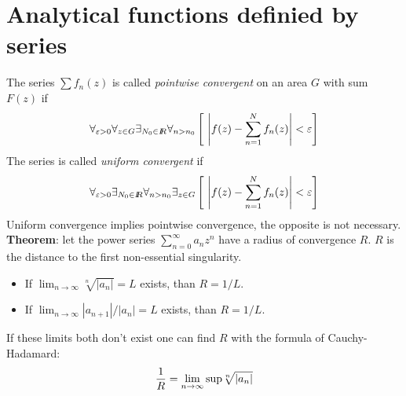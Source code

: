 \documentclass[a4paper,fancyheadings,twoside]{report}
\begin{document}
\section{Analytical functions definied by series}
The series $\sum f_n(z)$ is called {\it pointwise convergent} on an area $G$
with sum $F(z)$ if
\[
\forall_{\varepsilon>0}\forall_{z\in G}\exists_{N_0\in I\hspace{-1mm}R}\forall_{n>n_0}
\left[~\left|f(z)-\sum_{n=1}^Nf_n(z)\right|<\varepsilon\right]
\]
The series is called {\it uniform convergent} if
\[
\forall_{\varepsilon>0}\exists_{N_0\in I\hspace{-1mm}R}\forall_{n>n_0}\exists_{z\in G}
\left[~\left|f(z)-\sum_{n=1}^Nf_n(z)\right|<\varepsilon\right]
\]
Uniform convergence implies pointwise convergence, the opposite is not
necessary.
\npar
{\bf Theorem}: let the power series $\sum\limits_{n=0}^\infty a_nz^n$ have
a radius of convergence $R$. $R$ is the distance to the first non-essential
singularity.
\begin{itemize}
\item If $\displaystyle\lim_{n\rightarrow\infty}\sqrt[n]{|a_n|}=L$ exists, than $R=1/L$.
\item If $\displaystyle\lim_{n\rightarrow\infty}|a_{n+1}|/|a_n|=L$ exists, than $R=1/L$.
\end{itemize}
If these limits both don't exist one can find $R$ with the formula of
Cauchy-Hadamard:
\[
\frac{1}{R}=\lim_{n\rightarrow\infty}{\rm sup}\sqrt[n]{|a_n|}
\]
\end{document}
